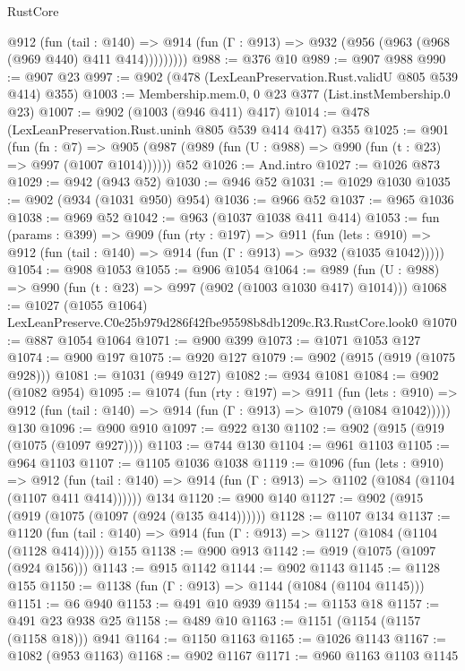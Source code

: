 \begin{lexlean}{RustCore}
\begin{coremodule}
          @912
            (fun (tail : @140) =>
            @914 (fun (Γ : @913) => @932 (@956 (@963 (@968 (@969 @440) @411 @414)))))))))
@988 := @376 @10
@989 := @907 @988
@990 := @907 @23
@997 := @902 (@478 (LexLeanPreservation.Rust.validU @805 @539 @414) @355)
@1003 := Membership.mem.{0, 0} @23 @377 (List.instMembership.{0} @23)
@1007 := @902 (@1003 (@946 @411) @417)
@1014 := @478 (LexLeanPreservation.Rust.uninh @805 @539 @414 @417) @355
@1025 := @901
    (fun (fn : @7) =>
    @905 (@987 (@989 (fun (U : @988) => @990 (fun (t : @23) => @997 (@1007 @1014))))))
    @52
@1026 := And.intro
@1027 := @1026 @873
@1029 := @942 (@943 @52)
@1030 := @946 @52
@1031 := @1029 @1030
@1035 := @902 (@934 (@1031 @950) @954)
@1036 := @966 @52
@1037 := @965 @1036
@1038 := @969 @52
@1042 := @963 (@1037 @1038 @411 @414)
@1053 := fun (params : @399) =>
  @909
    (fun (rty : @197) =>
    @911
      (fun (lets : @910) =>
      @912 (fun (tail : @140) => @914 (fun (Γ : @913) => @932 (@1035 @1042)))))
@1054 := @908 @1053
@1055 := @906 @1054
@1064 := @989 (fun (U : @988) => @990 (fun (t : @23) => @997 (@902 (@1003 @1030 @417) @1014)))
@1068 := @1027 (@1055 @1064) LexLeanPreserve.C0e25b979d286f42fbe95598b8db1209c.R3.RustCore.look0
@1070 := @887 @1054 @1064
@1071 := @900 @399
@1073 := @1071 @1053 @127
@1074 := @900 @197
@1075 := @920 @127
@1079 := @902 (@915 (@919 (@1075 @928)))
@1081 := @1031 (@949 @127)
@1082 := @934 @1081
@1084 := @902 (@1082 @954)
@1095 := @1074
    (fun (rty : @197) =>
    @911
      (fun (lets : @910) =>
      @912 (fun (tail : @140) => @914 (fun (Γ : @913) => @1079 (@1084 @1042)))))
    @130
@1096 := @900 @910
@1097 := @922 @130
@1102 := @902 (@915 (@919 (@1075 (@1097 @927))))
@1103 := @744 @130
@1104 := @961 @1103
@1105 := @964 @1103
@1107 := @1105 @1036 @1038
@1119 := @1096
    (fun (lets : @910) =>
    @912 (fun (tail : @140) => @914 (fun (Γ : @913) => @1102 (@1084 (@1104 (@1107 @411 @414))))))
    @134
@1120 := @900 @140
@1127 := @902 (@915 (@919 (@1075 (@1097 (@924 (@135 @414))))))
@1128 := @1107 @134
@1137 := @1120
    (fun (tail : @140) => @914 (fun (Γ : @913) => @1127 (@1084 (@1104 (@1128 @414)))))
    @155
@1138 := @900 @913
@1142 := @919 (@1075 (@1097 (@924 @156)))
@1143 := @915 @1142
@1144 := @902 @1143
@1145 := @1128 @155
@1150 := @1138 (fun (Γ : @913) => @1144 (@1084 (@1104 @1145)))
@1151 := @6 @940
@1153 := @491 @10 @939
@1154 := @1153 @18
@1157 := @491 @23 @938 @25
@1158 := @489 @10
@1163 := @1151 (@1154 (@1157 (@1158 @18))) @941
@1164 := @1150 @1163
@1165 := @1026 @1143
@1167 := @1082 (@953 @1163)
@1168 := @902 @1167
@1171 := @960 @1163 @1103 @1145

\end{coremodule}
\end{lexlean}
